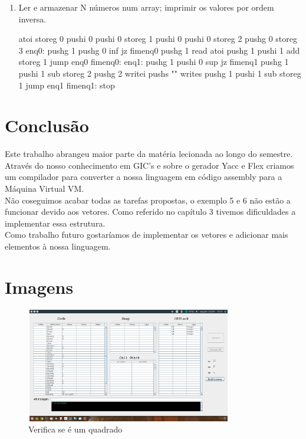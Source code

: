 \documentclass{report}
\begin{document}
\begin{enumerate}
	\begin{code}
		
	\end{code}

	\indent
	
	
	\item Ler e armazenar N números num array; imprimir os valores por ordem inversa.
	
	\begin{code}
		
		atoi
		storeg 0
		pushi 0
		pushi 0
		storeg 1
		pushi 0
		pushi 0
		storeg 2
		pushg 0
		storeg 3
		enq0:
		pushg 1
		pushg 0
		inf
		jz fimenq0
		pushg 1
		read
		atoi
		pushg 1
		pushi 1
		add
		storeg 1
		jump enq0
		fimenq0:
		enq1:
		pushg 1
		pushi 0
		sup
		jz fimenq1
		pushg 1
		pushi 1
		sub
		storeg 2
		pushg 2
		writei
		pushs "\n"
		writes
		pushg 1
		pushi 1
		sub
		storeg 1
		jump enq1
		fimenq1:
		stop
		
	\end{code}

	\indent
	
	
\end{enumerate}
  





\chapter{Conclusão} \label{concl}
 \indent
 Este trabalho abrangeu maior parte da matéria lecionada ao longo do semestre. Através do nosso conhecimento em GIC's e sobre o gerador Yacc e Flex criamos um compilador para converter a nossa linguagem em código assembly para a Máquina Virtual VM.\\
 Não coseguimos acabar todas as tarefas propostas, o exemplo 5 e 6 não estão a funcionar devido aos vetores. Como referido no capítulo 3 tivemos dificuldades a implementar essa estrutura.\\
 \indent
 Como trabalho futuro gostaríamos de implementar os vetores e adicionar mais elementos à nossa linguagem. 

\appendix
\chapter{Imagens}

\begin{figure}[h]
	\centering
	\includegraphics[width=9cm,height= 5cm]{exemplo1-1.png}
	\caption{Verifica se é um quadrado}
	\label{Exemplo 1.1}
\end{figure}
\end{document}
